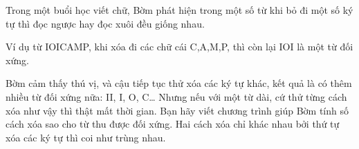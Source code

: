 Trong một buổi học viết chữ, Bờm phát hiện trong một số từ khi bỏ đi một số ký tự thì đọc ngược hay đọc xuôi đều giống nhau.  

   Ví dụ từ IOICAMP, khi xóa đi các chữ cái C,A,M,P, thì còn lại IOI là một từ đối xứng.  

   Bờm cảm thấy thú vị, và cậu tiếp tục thử xóa các ký tự khác, kết quả là có thêm nhiều từ đối xứng nữa: II, I, O, C… Nhưng nếu với một từ dài, cứ thử từng cách xóa như vậy thì thật mất thời gian. Bạn hãy viết chương trình giúp Bờm tính số cách xóa sao cho từ thu được đối xứng. Hai cách xóa chỉ khác nhau bởi thứ tự xóa các ký tự thì coi như trùng nhau.  

\